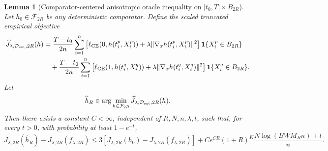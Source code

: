 \documentclass[11pt]{article}
\theoremstyle{plain}
\newtheorem{lemma}[theorem]{Lemma}
\theoremstyle{definition}
\theoremstyle{remark}
\begin{document}
\fi
\begin{lemma}[Comparator-centered anisotropic oracle inequality on \(\lbrack t_0,T\rbrack\times B_{2R}\)]
\label{lem:C3-aniso-local-complexity}
Let \(h_0\in\mathcal F_{2R}\) be any deterministic comparator. Define the
scaled truncated empirical objective
\[
\begin{aligned}
\widehat J_{\lambda,\mathcal D_{\rm ext},2R}(h)
&=
\frac{T-t_0}{2n}\sum_{i=1}^n
\left[
\ell_{\rm CE}(0,h(t_i^p,X_i^p))
+
\lambda\|\nabla_xh(t_i^p,X_i^p)\|^2
\right]\mathbf 1\{X_i^p\in B_{2R}\}
\\
&\quad+
\frac{T-t_0}{2n}\sum_{i=1}^n
\left[
\ell_{\rm CE}(1,h(t_i^q,X_i^q))
+
\lambda\|\nabla_xh(t_i^q,X_i^q)\|^2
\right]\mathbf 1\{X_i^q\in B_{2R}\}.
\end{aligned}
\]
Let
\[
\widehat h_R
\in
\arg\min_{h\in\mathcal F_{2R}}
\widehat J_{\lambda,\mathcal D_{\rm ext},2R}(h).
\]
Then there exists a constant \(C<\infty\), independent of
\(R,N,n,\lambda,t\), such that, for every \(t>0\), with probability at least
\(1-e^{-t}\),
\begin{equation}
\label{eq:C6_comparator_oracle}
J_{\lambda,2R}(\widehat h_R)-J_{\lambda,2R}(f_{\lambda,2R})
\le
3\left[
J_{\lambda,2R}(h_0)-J_{\lambda,2R}(f_{\lambda,2R})
\right]
+
C e^{CR}(1+R)^K
\frac{N\log(BWM_R n)+t}{n}.
\end{equation}
\end{lemma}
\end{document}
